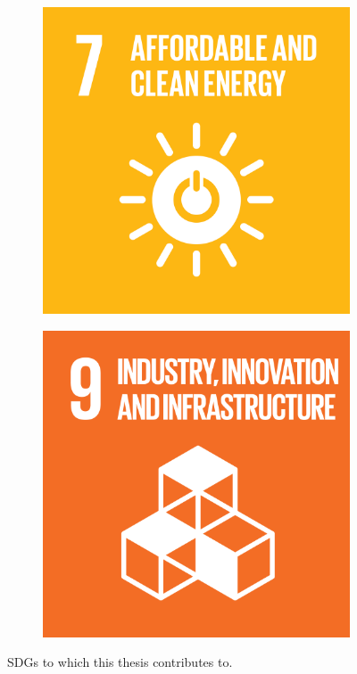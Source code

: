 \begin{figure}
    \centering
    \begin{subfigure}[b]{0.5\linewidth}
        \includegraphics[width=0.9\linewidth]{figures/1-introduction/E_SDG_goals_icons-07.png} 
        \label{fig:sdg07}
    \end{subfigure}\hfill
    \begin{subfigure}[b]{0.5\linewidth}
        \includegraphics[width=0.9\linewidth]{figures/1-introduction/E_SDG-goals_icons-09.png}
        \label{fig:sdg09}
	\end{subfigure}
	\caption{\glspl{SDG} to which this thesis contributes to.}
	\label{fig:sdgs}
\end{figure}

